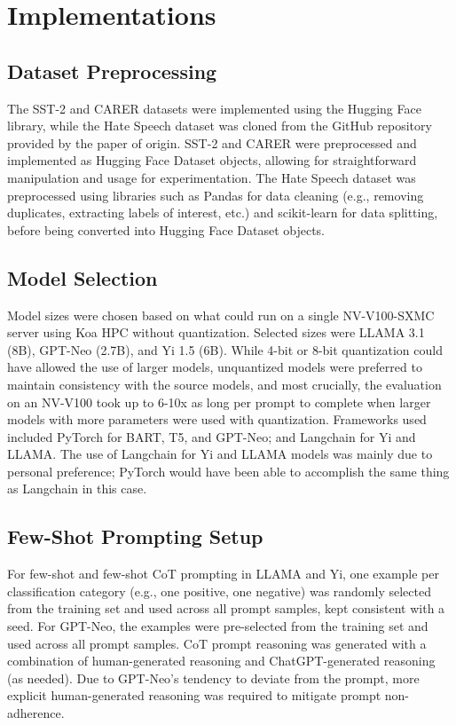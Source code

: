 \documentclass[twocolumn]{article}
\begin{document}
\section{Implementations}

\subsection{Dataset Preprocessing}
The SST-2 and CARER datasets were implemented using the Hugging Face library, while the Hate Speech dataset was cloned from the GitHub repository provided by the paper of origin. SST-2 and CARER were preprocessed and implemented as Hugging Face Dataset objects, allowing for straightforward manipulation and usage for experimentation. The Hate Speech dataset was preprocessed using libraries such as Pandas for data cleaning (e.g., removing duplicates, extracting labels of interest, etc.) and scikit-learn for data splitting, before being converted into Hugging Face Dataset objects.

\subsection{Model Selection}
Model sizes were chosen based on what could run on a single NV-V100-SXMC server using Koa HPC without quantization. Selected sizes were LLAMA 3.1 (8B), GPT-Neo (2.7B), and Yi 1.5 (6B). While 4-bit or 8-bit quantization could have allowed the use of larger models, unquantized models were preferred to maintain consistency with the source models, and most crucially, the evaluation on an NV-V100 took up to 6-10x as long per prompt to complete when larger models with more parameters were used with quantization. Frameworks used included PyTorch for BART, T5, and GPT-Neo; and Langchain for Yi and LLAMA. The use of Langchain for Yi and LLAMA models was mainly due to personal preference; PyTorch would have been able to accomplish the same thing as Langchain in this case.

\subsection{Few-Shot Prompting Setup}
For few-shot and few-shot CoT prompting in LLAMA and Yi, one example per classification category (e.g., one positive, one negative) was randomly selected from the training set and used across all prompt samples, kept consistent with a seed. For GPT-Neo, the examples were pre-selected from the training set and used across all prompt samples. CoT prompt reasoning was generated with a combination of human-generated reasoning and ChatGPT-generated reasoning (as needed). Due to GPT-Neo’s tendency to deviate from the prompt, more explicit human-generated reasoning was required to mitigate prompt non-adherence.
\end{document}
